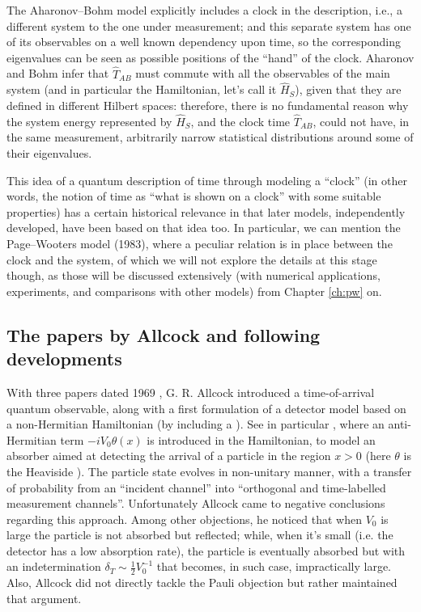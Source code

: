 The Aharonov--Bohm model explicitly includes a clock in the description, i.e.,
a different system to the one under measurement;
and this separate system has one of its observables
on a well known dependency upon time, so the corresponding eigenvalues can be seen
as possible positions of the ``hand'' of the clock.
Aharonov and Bohm infer that $\hat{T}_{AB}$ must commute with all the observables
of the main system (and in particular the Hamiltonian, let's call it $\hat{H}_S$),
given that they are defined in different Hilbert spaces:
therefore, there is no
fundamental reason why the system energy represented by $\hat{H}_S$, and the clock time $\hat{T}_{AB}$,
could not have, in the same measurement,
arbitrarily
narrow statistical distributions around some of their eigenvalues.

This idea of a quantum description of time through modeling a ``clock''
(in other words, the notion of time as ``what is shown on a clock'' with some suitable properties)
has a certain historical relevance in that later models, independently developed,
have been based on that idea too.
In particular, we can mention
the Page--Wooters model (1983), where a peculiar relation is in place between the clock and the system,
of which we will not explore the details at this stage though,
as those will be discussed extensively (with numerical applications, experiments, and comparisons with other models)
from Chapter \ref{ch:pw} on.

\subsection{The papers by Allcock and following developments}

With three papers dated 1969 \parencite{Allcock-1, Allcock-2, Allcock-3}, G. R. Allcock
introduced a time-of-arrival quantum observable,
along with a first formulation of a detector model based on a non-Hermitian
Hamiltonian (by including a ).
See in particular \cite[sec.II-IV]{Allcock-2}, where an anti-Hermitian term
$-iV_0\theta(x)$ is introduced in the Hamiltonian,
to model an absorber aimed at detecting
the arrival of a particle in the region $x>0$
(here $\theta$ is the Heaviside ).
The particle state evolves
in non-unitary manner, with a transfer of probability
from an ``incident channel''
into ``orthogonal and time-labelled measurement channels''.
Unfortunately Allcock came to negative conclusions regarding this approach.
Among other objections, he noticed that when $V_0$ is large the particle is not absorbed but reflected;
while, when it's small (i.e. the detector has a low absorption rate), the particle is eventually absorbed but
with an indetermination $\delta_T \sim \frac{1}{2}V_{0}^{-1}$
that becomes, in such case, impractically large.
Also, Allcock did not directly tackle the Pauli objection
but rather maintained that argument.

